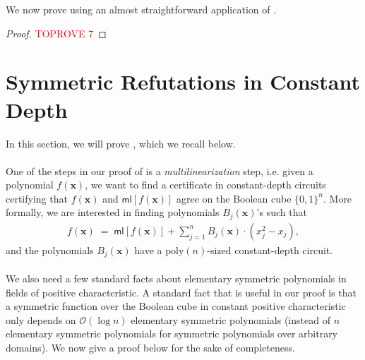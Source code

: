 \documentclass[11pt]{article}
\newcommand{\Boo}{\{0,1 \}}
\newcommand{\bigO}{\mathcal{O}}
\newcommand{\ml}{\mathsf{ml}}
\begin{document}
\noindent
We now prove  using an almost straightforward application of .\\

\begin{proof}\textcolor{red}{TOPROVE 7}\end{proof}














\section{Symmetric Refutations in Constant Depth}
In this section, we will prove , which we recall below.
\symconstant*

 \paragraph{}One of the steps in our proof of  is a \emph{multilinearization} step, i.e. given a polynomial $f(\mathbf{x})$, we want to find a certificate in constant-depth circuits certifying that $f(\mathbf{x})$ and $\ml[f(\mathbf{x})]$ agree on the Boolean cube $\Boo^{n}$. More formally, we are interested in finding polynomials $B_{j}(\mathbf{x})$'s such that
 \begin{align*}
     f(\mathbf{x}) \; = \; \ml[f(\mathbf{x})] + \sum_{j=1}^{n} B_{j}(\mathbf{x}) \cdot (x_{j}^{2} - x_{j}),
 \end{align*}
 and the polynomials $B_{j}(\mathbf{x})$ have a $\mathrm{poly}(n)$-sized constant-depth circuit.




\paragraph{}We also need a few standard facts about elementary symmetric polynomials in fields of positive characteristic. A standard fact that is useful in our proof is that a symmetric function over the Boolean cube in constant positive characteristic only depends on $\bigO(\log n)$ elementary symmetric polynomials (instead of $n$ elementary symmetric polynomials for symmetric polynomials over arbitrary domains). We now give a proof below for the sake of completeness.
\end{document}
